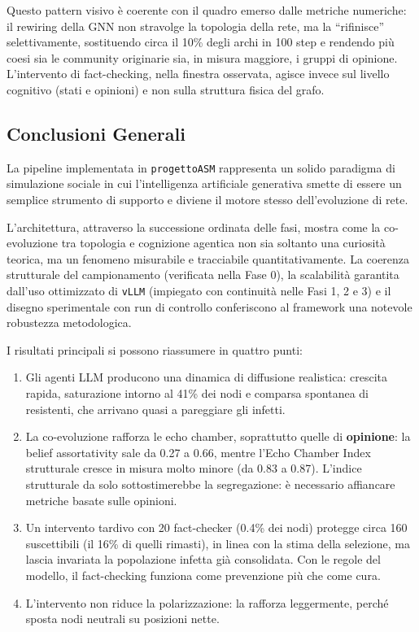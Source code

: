\documentclass[11pt, a4paper]{article}
\begin{document}
Questo pattern visivo è coerente con il quadro emerso dalle metriche numeriche: il rewiring della GNN non stravolge la topologia della rete, ma la ``rifinisce'' selettivamente, sostituendo circa il 10\% degli archi in 100 step e rendendo più coesi sia le community originarie sia, in misura maggiore, i gruppi di opinione. L'intervento di fact-checking, nella finestra osservata, agisce invece sul livello cognitivo (stati e opinioni) e non sulla struttura fisica del grafo.

\subsection{Conclusioni Generali}
La pipeline implementata in \texttt{progettoASM} rappresenta un solido paradigma di simulazione sociale in cui l'intelligenza artificiale generativa smette di essere un semplice strumento di supporto e diviene il motore stesso dell'evoluzione di rete.

L'architettura, attraverso la successione ordinata delle fasi, mostra come la co-evoluzione tra topologia e cognizione agentica non sia soltanto una curiosità teorica, ma un fenomeno misurabile e tracciabile quantitativamente. La coerenza strutturale del campionamento (verificata nella Fase 0), la scalabilità garantita dall'uso ottimizzato di \texttt{vLLM} (impiegato con continuità nelle Fasi 1, 2 e 3) e il disegno sperimentale con run di controllo conferiscono al framework una notevole robustezza metodologica.

I risultati principali si possono riassumere in quattro punti:
\begin{enumerate}
    \item Gli agenti LLM producono una dinamica di diffusione realistica: crescita rapida, saturazione intorno al 41\% dei nodi e comparsa spontanea di resistenti, che arrivano quasi a pareggiare gli infetti.
    \item La co-evoluzione rafforza le echo chamber, soprattutto quelle di \textbf{opinione}: la belief assortativity sale da 0.27 a 0.66, mentre l'Echo Chamber Index strutturale cresce in misura molto minore (da 0.83 a 0.87). L'indice strutturale da solo sottostimerebbe la segregazione: è necessario affiancare metriche basate sulle opinioni.
    \item Un intervento tardivo con 20 fact-checker (0.4\% dei nodi) protegge circa 160 suscettibili (il 16\% di quelli rimasti), in linea con la stima della selezione, ma lascia invariata la popolazione infetta già consolidata. Con le regole del modello, il fact-checking funziona come prevenzione più che come cura.
    \item L'intervento non riduce la polarizzazione: la rafforza leggermente, perché sposta nodi neutrali su posizioni nette.
\end{enumerate}
\end{document}
